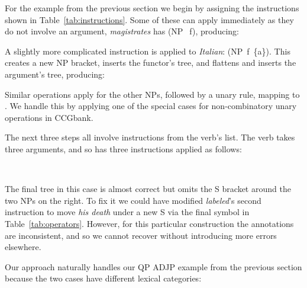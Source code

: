 For the example from the previous section we begin by assigning the instructions shown in Table~\ref{tab:instructions}.
Some of these can apply immediately as they do not involve an argument, \myeg \textit{magistrates} has (NP$\;$~f), producing:

\begin{center}
\end{center}

A slightly more complicated instruction is applied to \textit{Italian}: (NP~f~\{a\}).
This creates a new NP bracket, inserts the functor's tree, and flattens and inserts the argument's tree, producing:

\begin{center}
\end{center}

Similar operations apply for the other NPs, followed by a unary rule, mapping  to .
We handle this by applying one of the special cases for non-combinatory unary operations in CCGbank.

The next three steps all involve instructions from the verb's list.
The verb takes three arguments, and so has three instructions applied as follows:

\begin{center}
\strut
\hfill
{}
\hfill
{}
\hfill
\strut
\\
\strut
\hfill
{}
\hfill
\strut
\end{center}

The final tree in this case is almost correct but omits the S bracket around the two NPs on the right.
To fix it we could have modified \textit{labeled}'s second instruction to move \textit{his death} under a new S via the final symbol in Table~\ref{tab:operators}.
However, for this particular construction the \ptb annotations are inconsistent, and so we cannot recover without introducing more errors elsewhere.

Our approach naturally handles our QP \myvs ADJP example from the previous section because the two cases have different lexical categories: 

